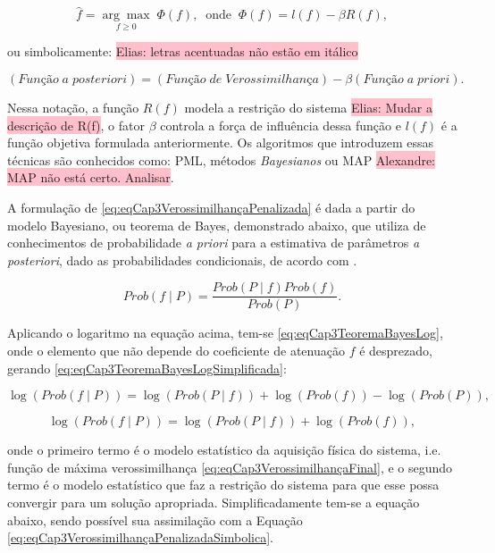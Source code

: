 {{\begin{equation}
\hat{f} = \underset{f\geq 0}{\arg\max} \; \Phi(f), \;\; \text{onde} \;\; \Phi(f) = l(f) - \beta R(f),
\label{eq:eqCap3VerossimilhançaPenalizada}
\end{equation}

\noindent ou simbolicamente:  \colorbox{pink}{Elias: letras acentuadas não estão em itálico}

\begin{equation}
(Função \;a \;posteriori) = (Função \;de \;Verossimilhança) - \beta (Função \;a \;priori).
\label{eq:eqCap3VerossimilhançaPenalizadaSimbolica}
\end{equation}

Nessa notação, a função $R(f)$ modela a restrição do sistema \colorbox{pink}{Elias: Mudar a descrição de R(f)}, o fator $\beta$ controla a força de influência dessa função e $l(f)$ é a função objetiva formulada anteriormente. Os algoritmos que introduzem essas técnicas são conhecidos como: \ac{PML}, métodos \textit{Bayesianos} ou \ac{MAP} \colorbox{pink}{Alexandre: MAP não está certo. Analisar}. 

A formulação de \eqref{eq:eqCap3VerossimilhançaPenalizada} é dada a partir do modelo Bayesiano, ou teorema de Bayes, demonstrado abaixo, que utiliza de conhecimentos de probabilidade \textit{a priori} para a estimativa de parâmetros \textit{a posteriori}, dado as probabilidades condicionais, de acordo com .  

\begin{equation}
Prob(f \mid P) = \dfrac{Prob(P \mid f) Prob(f)}{Prob(P)}.
\label{eq:eqCap3TeoremaBayes}
\end{equation}  

Aplicando o logaritmo na equação acima, tem-se \eqref{eq:eqCap3TeoremaBayesLog}, onde o elemento que não depende do coeficiente de atenuação $f$ é desprezado, gerando \eqref{eq:eqCap3TeoremaBayesLogSimplificada}:

\begin{equation}
\log(Prob(f \mid P)) = \log(Prob(P \mid f)) + \log(Prob(f)) - \log(Prob(P)),
\label{eq:eqCap3TeoremaBayesLog}
\end{equation}

\begin{equation}
\log(Prob(f \mid P)) = \log(Prob(P \mid f)) + \log(Prob(f)),
\label{eq:eqCap3TeoremaBayesLogSimplificada}
\end{equation}

\noindent onde o primeiro termo é o modelo estatístico da aquisição física do sistema, i.e. função de máxima verossimilhança \eqref{eq:eqCap3VerossimilhançaFinal}, e o segundo termo é o modelo estatístico que faz a restrição do sistema para que esse possa convergir para um solução apropriada. Simplificadamente tem-se a equação abaixo, sendo possível sua assimilação com a Equação \ref{eq:eqCap3VerossimilhançaPenalizadaSimbolica}.

}}
